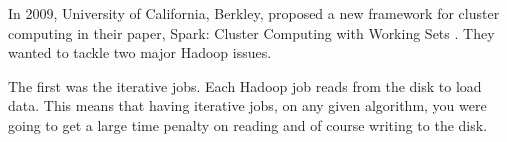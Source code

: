 %
%
%
%
%

In 2009, University of California, Berkley, proposed a new framework for cluster computing in their paper, Spark: Cluster Computing with Working Sets \cite{Zaharia:2010:SCC:1863103.1863113}. They wanted to tackle two major Hadoop issues. 

The first was the iterative jobs. Each Hadoop job reads from the disk to load data. This means that having iterative jobs, on any given algorithm, you were going to get a large time penalty on reading and of course writing to the disk. 

